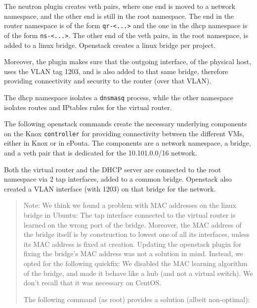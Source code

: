 
The neutron plugin creates veth pairs, where one end is moved to a
network namespace, and the other end is still in the root namespace.
The end in the router namespace is of the form
\texttt{qr-\textless{}...\textgreater{}} and the one in the dhcp
namespace is of the form \texttt{ns-\textless{}...\textgreater{}}. The
other end of the veth pairs, in the root namespace, is added to a
linux bridge. Openstack creates a linux bridge per project.

Moreover, the plugin makes sure that the outgoing interface, of the
physical host, uses the VLAN tag 1203, and is also added to that same
bridge, therefore providing connectivity and security to the router
(over that VLAN).

The dhcp namespace isolates a \texttt{dnsmasq} process, while the
other
namespace isolates routes and IPtables rules for the virtual router.


The following openstack commands create the necessary underlying
components on the Knox \texttt{controller} for providing connectivity
between the different VMs, either in Knox or in ePouta. The components
are a network namespace, a bridge, and a veth pair that is dedicated
for the 10.101.0.0/16 network.


Both the virtual router and the DHCP server are connected to the root
namespace via 2 tap interfaces, added to a common bridge. Openstack
also created a VLAN interface (with 1203) on that bridge for the
 network.


\begin{quote}
  Note: We think we found a problem with MAC addresses on the linux
  bridge in Ubuntu: The tap interface connected to the virtual router
  is learned on the wrong port of the bridge. Moreover, the MAC
  address of the bridge itself is by construction to lowest one of all
  its interfaces, unless its MAC address is fixed at
  creation. Updating the openstack plugin for fixing the bridge's MAC
  address was not a solution in mind. Instead, we opted for the
  following quickfix: We disabled the MAC learning algorithm of the
  bridge, and made it behave like a hub (and not a virtual switch). We
  don't recall that it was necessary on CentOS.

  The following command (as root) provides a solution (albeit
  non-optimal):

\end{quote}

